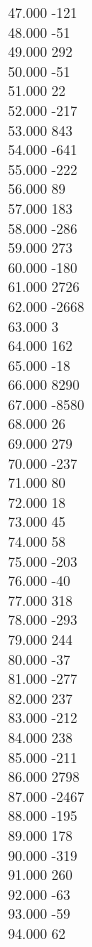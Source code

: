 { 47.000	-121 \\
 48.000	-51 \\
 49.000	292 \\
 50.000	-51 \\
 51.000	22 \\
 52.000	-217 \\
 53.000	843 \\
 54.000	-641 \\
 55.000	-222 \\
 56.000	89 \\
 57.000	183 \\
 58.000	-286 \\
 59.000	273 \\
 60.000	-180 \\
 61.000	2726 \\
 62.000	-2668 \\
 63.000	3 \\
 64.000	162 \\
 65.000	-18 \\
 66.000	8290 \\
 67.000	-8580 \\
 68.000	26 \\
 69.000	279 \\
 70.000	-237 \\
 71.000	80 \\
 72.000	18 \\
 73.000	45 \\
 74.000	58 \\
 75.000	-203 \\
 76.000	-40 \\
 77.000	318 \\
 78.000	-293 \\
 79.000	244 \\
 80.000	-37 \\
 81.000	-277 \\
 82.000	237 \\
 83.000	-212 \\
 84.000	238 \\
 85.000	-211 \\
 86.000	2798 \\
 87.000	-2467 \\
 88.000	-195 \\
 89.000	178 \\
 90.000	-319 \\
 91.000	260 \\
 92.000	-63 \\
 93.000	-59 \\
 94.000	62 \\
}
